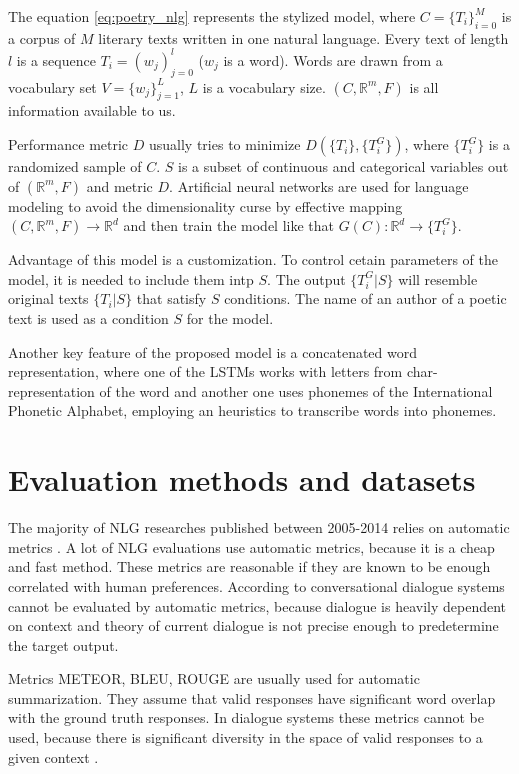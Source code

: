 The equation \ref{eq:poetry_nlg} represents the stylized model, where $C = \{ T_i\}^M_{i=0}$ is a corpus of $M$ literary texts written in one natural language. Every text of length $l$ is a sequence $T_i = (w_j)^l_{j=0}$ ($w_j$ is a word). Words are drawn from a vocabulary set $V = \{ w_j \}^L_{j=1}$, $L$ is a vocabulary size. $(C, \mathbb{R}^m, F)$ is all information available to us.

Performance metric $D$ usually tries to minimize $D(\{T_i\}, \{T_i^G\})$, where $\{T_i^G\}$ is a randomized sample of $C$. $S$ is a subset of continuous and categorical variables out of $(\mathbb{R}^m, F)$ and metric $D$. Artificial neural networks are used for language modeling to avoid the dimensionality curse by effective mapping $(C,\mathbb{R}^m, F) \rightarrow \mathbb{R}^d$ and then train the model like that $G(C):\mathbb{R}^d \rightarrow \{ T_i^G\}$. 

Advantage of this model is a customization. To control cetain parameters of the model, it is needed to include them intp $S$. The output $\{T_i^G|S\}$ will resemble original texts $\{T_i|S\}$ that satisfy $S$ conditions. The name of an author of a poetic text is used as a condition $S$ for the model. 

Another key feature of the proposed model is a concatenated word representation, where one of the LSTMs works with letters from char-representation of the word and another one uses phonemes of the International Phonetic Alphabet, employing an heuristics to transcribe words into phonemes.
 
\chapter{Evaluation methods and datasets} \label{eval_datasets_section}
The majority of NLG researches published between 2005-2014 relies on automatic metrics \cite{gkatzia2015snapshot}. A lot of NLG evaluations use automatic metrics, because it is a cheap and fast method. These metrics are reasonable if they are known to be enough correlated with human preferences. According to \cite{artstein2009semi} conversational dialogue systems cannot be evaluated by automatic metrics, because dialogue is heavily dependent on context and theory of current dialogue is not precise enough to predetermine the target output.  

Metrics METEOR, BLEU, ROUGE are usually used for automatic summarization. They assume that valid responses have significant word overlap with the ground truth responses. In dialogue systems these metrics cannot be used, because there is significant diversity in the space of valid responses to a given context \cite{liu2016not}.

